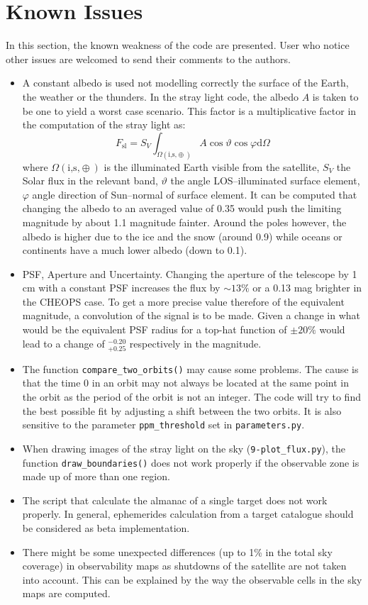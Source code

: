 \documentclass[a4paper,10pt]{article}
\begin{document}
\section{Known Issues} \label{sec:KnownIssues}
In this section, the known weakness of the code are presented. User who notice other issues are welcomed to send their comments to the authors.
\begin{itemize}
 \item A constant albedo is used not modelling correctly the surface of the Earth, the weather or the thunders. In the stray light code, the albedo $A$ is taken to be one to yield a worst case scenario. This factor is a multiplicative factor in the computation of the stray light as:
\begin{equation}
 F_\text{sl} = S_V\int_{\Omega({\text{i,s,}\oplus})} A\cos\vartheta\cos\varphi\text{d}\Omega
\end{equation}
where $\Omega({\text{i,s,}\oplus})$ is the illuminated Earth visible from the satellite, $S_V$ the Solar flux in the relevant band, $\vartheta$ the angle LOS--illuminated surface element, $\varphi$ angle direction of Sun--normal of surface element. It can be computed that changing the albedo to an averaged value of 0.35 \citep{Pater2001} would push the limiting magnitude by about 1.1 magnitude fainter. Around the poles however, the albedo is higher due to the ice and the snow (around 0.9) while oceans or continents have a much lower albedo (down to 0.1).
\item PSF, Aperture and Uncertainty. Changing the aperture of the telescope by 1 cm with a constant PSF increases the flux by $\sim13\%$ or a 0.13 mag brighter in the CHEOPS case. To get a more precise value therefore of the equivalent magnitude, a convolution of the signal is to be made. Given a change in what would be the equivalent PSF radius for a top-hat function of $\pm 20\%$ would lead to a change of $^{-0.20}_{+0.25}$ respectively in the magnitude.
 \item The function \verb=compare_two_orbits()= may cause some problems. The cause is that the time 0 in an orbit may not always be located at the same point in the orbit as the period of the orbit is not an integer. The code will try to find the best possible fit by adjusting a shift between the two orbits. It is also sensitive to the parameter \verb=ppm_threshold= set in \verb=parameters.py=.
 \item When drawing images of the stray light on the sky (\verb=9-plot_flux.py=), the function \verb=draw_boundaries()= does not work properly if the observable zone is made up of more than one region.
 \item The script that calculate the almanac of a single target does not work properly. In general, ephemerides calculation from a target catalogue should be considered as beta implementation. 
 \item There might be some unexpected differences (up to 1\% in the total sky coverage) in observability maps as shutdowns of the satellite are not taken into account. This can be explained by the way the observable cells in the sky maps are computed.
\end{itemize}
\end{document}
